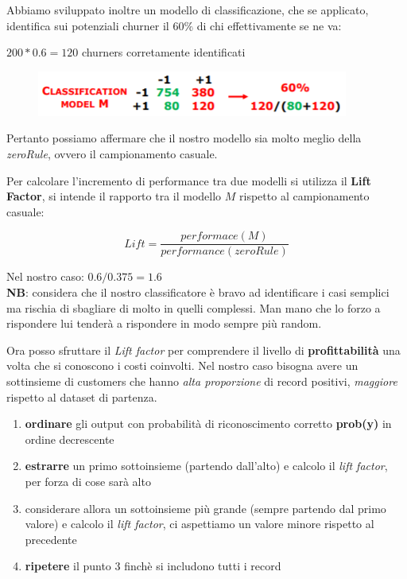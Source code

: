 Abbiamo sviluppato inoltre un modello di classificazione, che se applicato, identifica sui potenziali churner il $60\%$ di chi effettivamente se ne va: 

$200*0.6 = 120$ churners corretamente identificati
\begin{figure}[H]
	\centering
	\includegraphics[height=0.1 \linewidth]{classification/pict/esChurnerModel.png}
\end{figure}

Pertanto possiamo affermare che il nostro modello sia molto meglio della \textit{zeroRule}, ovvero il campionamento casuale. 

\begin{defn}
	Per calcolare l'incremento di performance tra due modelli si utilizza il \textbf{Lift Factor}, si intende il rapporto tra il modello $M$ rispetto al campionamento casuale:
	
	\[Lift = \frac{performace(M)}{performance(zeroRule)}\]
\end{defn}
Nel nostro caso: $0.6/0.375 = 1.6$\\

\textbf{NB}: considera che il nostro classificatore \`e bravo ad identificare i casi semplici ma rischia di sbagliare di molto in quelli complessi. Man mano che lo forzo a rispondere lui tenderà a rispondere in modo sempre pi\`u random.

Ora posso sfruttare il \textit{Lift factor} per comprendere il livello di \textbf{profittabilit\`a} una volta che si conoscono i costi coinvolti. Nel nostro caso bisogna avere un sottinsieme di customers che hanno \textit{alta proporzione} di record positivi, \textit{maggiore} rispetto al dataset di partenza.

\begin{enumerate}
	\item \textbf{ordinare} gli output con probabilit\`a di riconoscimento corretto \textbf{prob(y)} in ordine decrescente
	\item \textbf{estrarre} un primo sottoinsieme (partendo dall'alto) e calcolo il \textit{lift factor}, per forza di cose sarà alto
	\item considerare allora un sottoinsieme più grande (sempre partendo dal primo valore) e calcolo il \textit{lift factor}, ci aspettiamo un valore minore rispetto al precedente
	\item \textbf{ripetere} il punto 3 finchè si includono tutti i record
\end{enumerate} 

